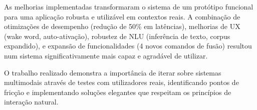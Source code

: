 \documentclass{report}
\begin{document}
As melhorias implementadas transformaram o sistema de um protótipo funcional para uma aplicação robusta e utilizável em contextos reais. A combinação de otimizações de desempenho (redução de 50\% em latências), melhorias de UX (wake word, auto-ativação), robustez de NLU (inferência de texto, corpus expandido), e expansão de funcionalidades (4 novos comandos de fusão) resultou num sistema significativamente mais capaz e agradável de utilizar.

O trabalho realizado demonstra a importância de iterar sobre sistemas multimodais através de testes com utilizadores reais, identificando pontos de fricção e implementando soluções elegantes que respeitam os princípios de interação natural.

\end{document}

